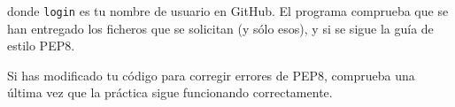 \documentclass[11pt,a4paper]{article}
\begin{document}
donde \texttt{login} es tu nombre de usuario en GitHub. El programa comprueba que se han entregado los ficheros que se solicitan (y sólo esos), y si se sigue la guía de estilo PEP8. 

Si has modificado tu código para corregir errores de PEP8, comprueba una última vez que la práctica sigue funcionando correctamente.




\end{document}
